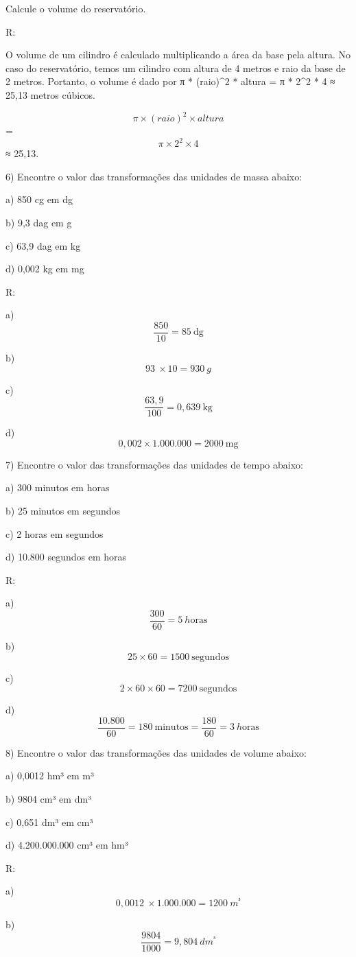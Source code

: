 Calcule o volume do reservatório.

R:

O volume de um cilindro é calculado multiplicando a área da base pela
altura. No caso do reservatório, temos um cilindro com altura de 4
metros e raio da base de 2 metros. Portanto, o volume é dado por π *
(raio)\^{}2 * altura = π * 2\^{}2 * 4 ≈ 25,13 metros cúbicos.

\[π \times (raio)^{2} \times altura\] = \[π \times 2^{2} \times {4}\] ≈
25,13.

6) Encontre o valor das transformações das unidades de massa abaixo:

a) 850 cg em dg

b) 9,3 dag em g

c) 63,9 dag em kg

d) 0,002 kg em mg

R:

a) \[\frac{850}{10} = 85\ \text{dg}\]

b) \[93\  \times 10 = 930\ g\]

c) \[\frac{63,9}{100} = 0,639\ \text{kg}\]

d) \[0,002 \times 1.000.000 = 2000\ \text{mg}\]

7) Encontre o valor das transformações das unidades de tempo abaixo:

a) 300 minutos em horas

b) 25 minutos em segundos

c) 2 horas em segundos

d) 10.800 segundos em horas

R:

a) \[\frac{300}{60} = 5\ h\text{oras}\]

b) \[25 \times 60 = 1500\ \text{segundos}\]

c) \[2 \times 60 \times 60 = 7200\ \text{segundos}\]

d)
\[\frac{10.800}{60} = 180\ \text{minutos} = \frac{180}{60} = 3\ h\text{oras}\]

8) Encontre o valor das transformações das unidades de volume abaixo:

a) 0,0012 hm³ em m³

b) 9804 cm³ em dm³

c) 0,651 dm³ em cm³

d) 4.200.000.000 cm³ em hm³

R:

a) \[0,0012\  \times 1.000.000 = 1200\ m^{³}\]

b) \[\frac{9804}{1000} = 9,804\ dm^{³}\]

